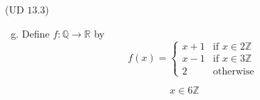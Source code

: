 \begin{frame}{}
  \begin{exampleblock}{(UD $13.3$)}
    \begin{enumerate}[(a)]
      \setcounter{enumi}{6}
      \item Define $f: \mathbb{Q} \to \mathbb{R}$ by
	\[
	  f(x) = \left\{\begin{array}{lr}
	    x + 1 & \text{if } x \in 2 \mathbb{Z} \\
	    x - 1 & \text{if } x \in 3 \mathbb{Z} \\
	    2     & \text{otherwise}
	  \end{array}\right.
	\]
    \end{enumerate}
  \end{exampleblock}

  \pause
  \[
    x \in 6 \mathbb{Z}
  \]
\end{frame}
